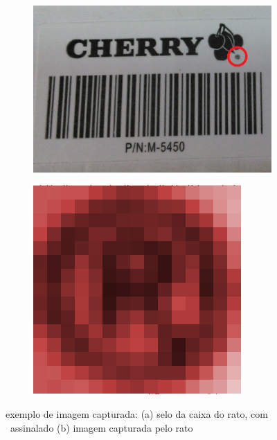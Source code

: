 \documentclass[a4paper]{article}
\begin{document}
\begin{figure}[h]
	\centering
	\begin{subfigure}[b]{0.40\textwidth}
		\centering
		\includegraphics[width=\linewidth]{box_pic}
		\caption{}
		\label{fig:Cherry_box}
	\end{subfigure}
	\begin{subfigure}[b]{0.40\textwidth}
		\centering
		\includegraphics[width=\linewidth]{rprintscreen_red}
		\caption{}
		\label{fig:registed_capture}
	\end{subfigure}
	\caption{exemplo de imagem capturada: (a) selo da caixa do rato, com \textregistered\ assinalado (b) imagem capturada pelo rato}
\end{figure}
\end{document}
